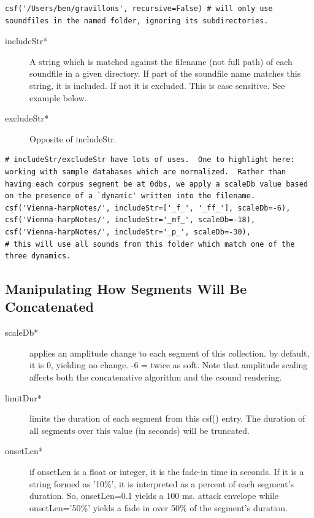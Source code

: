 \documentclass{article}
\begin{document}
\begin{spacing}{1.2}
\begin{lstlisting}
csf('/Users/ben/gravillons', recursive=False) # will only use soundfiles in the named folder, ignoring its subdirectories.
\end{lstlisting}

\begin{description}
\item[includeStr*] A string which is matched against the filename (not full path) of each soundfile in a given directory.  If part of the soundfile name matches this string, it is included.  If not it is excluded.  This is case sensitive.  See example below.

\item[excludeStr*] Opposite of includeStr.
\end{description}

\begin{lstlisting}
# includeStr/excludeStr have lots of uses.  One to highlight here: working with sample databases which are normalized.  Rather than having each corpus segment be at 0dbs, we apply a scaleDb value based on the presence of a `dynamic' written into the filename.
csf('Vienna-harpNotes/', includeStr=['_f_', '_ff_'], scaleDb=-6),
csf('Vienna-harpNotes/', includeStr='_mf_', scaleDb=-18),
csf('Vienna-harpNotes/', includeStr='_p_', scaleDb=-30),
# this will use all sounds from this folder which match one of the three dynamics.
\end{lstlisting}





\subsection{Manipulating How Segments Will Be Concatenated}
\begin{description}
\item[scaleDb*] applies an amplitude change to each segment of this collection. by default, it is 0, yielding no change. -6 = twice as soft.  Note that amplitude scaling affects both the concatenative algorithm and the csound rendering.  

\item[limitDur*] limits the duration of each segment from this csf() entry.  The duration of all segments over this value (in seconds) will be truncated.  

\item[onsetLen*] if onsetLen is a float or integer, it is the fade-in time in seconds.  If it is a string formed as '10\%', it is interpreted as a percent of each segment's duration.  So, onsetLen=0.1 yields a 100 ms. attack envelope while onsetLen='50\%' yields a fade in over 50\% of the segment's duration.


\end{description}
\end{spacing}
\end{document}
